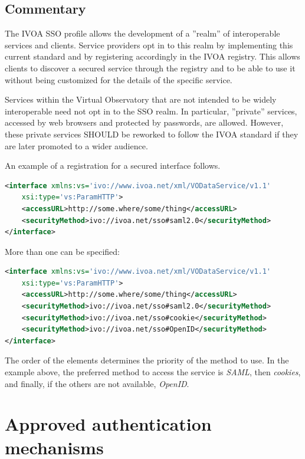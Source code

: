 \documentclass[11pt,a4paper]{ivoa}
\begin{document}
\subsection{Commentary}
The IVOA SSO profile allows the development of a ''realm'' of interoperable services and clients. 
Service providers opt in to this realm by implementing this current standard and by registering accordingly in the IVOA registry. 
This allows clients to discover a secured service through the registry and to be able to use it without 
being customized for the details of the specific service.

Services within the Virtual Observatory that are not intended to be widely interoperable need not opt in to the SSO realm. 
In particular, ''private'' services, accessed by web browsers and protected by passwords, are allowed. 
However, these private services SHOULD be reworked to follow the IVOA standard if they are later promoted to a wider audience.

An example of a registration for a secured interface follows.
\begin{lstlisting}[language=XML]
<interface xmlns:vs='ivo://www.ivoa.net/xml/VODataService/v1.1'  
	xsi:type='vs:ParamHTTP'>
	<accessURL>http://some.where/some/thing</accessURL>
	<securityMethod>ivo://ivoa.net/sso#saml2.0</securityMethod>
</interface> 
\end{lstlisting}

More than one  can be specified:
\begin{lstlisting}[language=XML]
<interface xmlns:vs='ivo://www.ivoa.net/xml/VODataService/v1.1'  
	xsi:type='vs:ParamHTTP'>
	<accessURL>http://some.where/some/thing</accessURL>
	<securityMethod>ivo://ivoa.net/sso#saml2.0</securityMethod>
	<securityMethod>ivo://ivoa.net/sso#cookie</securityMethod>
	<securityMethod>ivo://ivoa.net/sso#OpenID</securityMethod>
</interface> 
\end{lstlisting}


The order of the  elements determines the priority of
the method to use.  In the example above, the preferred method to access
the service is  {\em SAML}, then {\em cookies}, and finally, if the others are not available,
{\em OpenID}.

\section{Approved authentication mechanisms}
\end{document}
